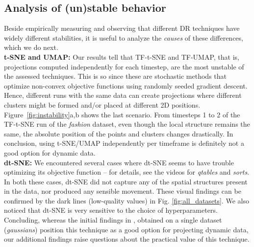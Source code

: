 \subsection{Analysis of (un)stable behavior}
\label{sec:unstable}
%
Beside empirically measuring and observing that different DR techniques have widely different stabilities, it is useful to analyze the \emph{causes} of these differences, which we do next.\\

\noindent\textbf{t-SNE and UMAP:} Our results tell that TF-t-SNE and TF-UMAP, that is, projections computed independently for each timestep, are the most unstable of the assessed techniques.
This is so since these are stochastic methods that optimize non-convex objective functions using randomly seeded gradient descent. Hence, different runs with the same data can create projections where different clusters might be formed and/or placed at different 2D positions. Figure~\ref{fig:instability}a,b shows the last scenario. From timesteps 1 to 2 of the TF-t-SNE run of the \textit{fashion} dataset, even though the local structure remains the same, the absolute position of the points and clusters changes drastically. In conclusion, using t-SNE/UMAP independently per timeframe is definitely not a good option for dynamic data.\\

\noindent\textbf{dt-SNE:} We encountered several cases where dt-SNE seems to have trouble optimizing its objective function -- for details, see the videos for \textit{qtables} and \textit{sorts}. In both these cases, dt-SNE did not capture any of the spatial structures present in the data, nor produced any sensible movement. These visual findings can be confirmed by the dark lines (low-quality values) in Fig. \ref{fig:all_datasets}. We also noticed that dt-SNE is very sensitive to the choice of hyperparameters. Concluding, whereas the initial findings in \cite{Rauber2016}, obtained on a single dataset (\emph{gaussians}) position this technique as a good option for projecting dynamic data, our additional findings raise questions about the practical value of this technique.\\

